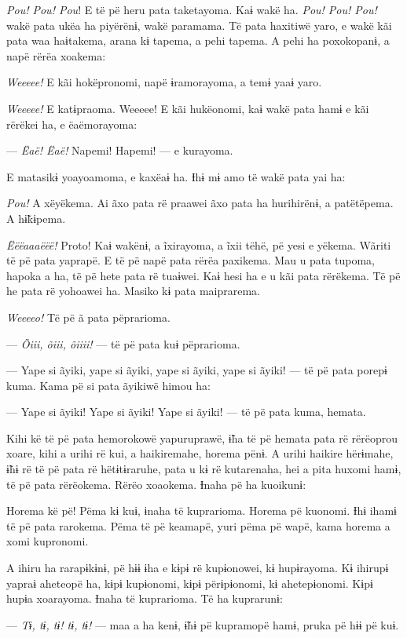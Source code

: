 \textit{Pou! Pou! Pou}! E të pë heru pata taketayoma. Kaɨ wakë ha. \textit{Pou! Pou! Pou!}
wakë pata ukëa ha piyërënɨ, wakë paramama. Të pata haxitiwë yaro, e wakë
kãi pata waa haɨtakema, arana kɨ tapema, a pehi tapema. A pehi ha
poxokopanɨ, a napë rërëa xoakema:

\textit{Weeeee!} E kãi hokëpronomi, napë ɨramorayoma, a temɨ yaaɨ yaro. 

\textit{Weeeee!} E katɨpraoma. Weeeee! E kãi hukëonomi, kaɨ wakë pata hamɨ e kãi
rërëkei ha, e ëaëmorayoma:

--- \textit{Ëaë! Ëaë!} Napemi! Hapemi! --- e kurayoma. 

E matasikɨ yoayoamoma, e kaxëaɨ ha. Ɨhɨ mɨ amo të wakë pata yai ha: 

\textit{Pou!} A xëyëkema. Ai ãxo pata rë praawei ãxo pata ha hurihirënɨ, a
patëtëpema. A hɨ̃kɨpema. 

\textit{Ëëëaaaëëë!} Proto! Kaɨ wakënɨ, a ĩxirayoma, a ĩxii tëhë, pë yesi e
yëkema. Wãriti të pë pata yaprapë. E të pë napë pata rërëa paxikema. Mau
u pata tupoma, hapoka a ha, të pë hete pata rë tuaɨwei. Kaɨ hesi ha e u
kãi pata rërëkema. Të pë he pata rë yohoawei ha. Masiko kɨ pata
maiprarema. 

\textit{Weeeeo!} Të pë ã pata pëprarioma. 

--- \textit{Õiii, õiii, õiiii!} --- të pë pata kuɨ pëprarioma.

--- Yape si ãyiki, yape si ãyiki, yape si ãyiki, yape si ãyiki! --- të
pë pata porepɨ kuma. Kama pë si pata ãyikiwë himou ha: 

--- Yape si ãyiki! Yape si ãyiki! Yape si ãyiki! --- të pë pata kuma,
hemata. 

Kihi kë të pë pata hemorokowë yapuruprawë, ɨ̃ha të pë hemata pata rë
rërëoprou xoare, kihi a urihi rë kui, a haikiremahe, horema pënɨ. A urihi haikire hërɨmahe, ɨ̃hɨ rë të pë pata rë hëtɨtɨraruhe, pata u kɨ rë
kutarenaha, hei a pita huxomi hamɨ, të pë pata rërëokema. Rërëo
xoaokema. Ɨnaha pë ha kuoikunɨ: 

Horema kë pë! Pëma kɨ kuɨ, ɨnaha të kuprarioma. Horema pë kuonomi. Ɨhɨ
ihamɨ të pë pata rarokema. Pëma të pë keamapë, yuri pëma pë wapë, kama
horema a xomi kupronomi. 

A ihiru ha rarapɨkɨnɨ, pë hɨɨ ɨha e kɨpɨ rë kupɨonowei, kɨ hupɨrayoma.
Kɨ ihirupɨ yapraɨ aheteopë ha, kɨpɨ kupɨonomi, kɨpɨ përɨpɨonomi, kɨ
ahetepɨonomi. Kɨpɨ hupɨa xoarayoma. Ɨnaha të kuprarioma. Të ha
kuprarunɨ: 

--- \textit{Tɨ, tɨ, tɨ! tɨ, tɨ!} --- maa a ha kenɨ, ɨ̃hɨ pë kupramopë hamɨ, pruka
pë hɨɨ pë kuɨ. 

